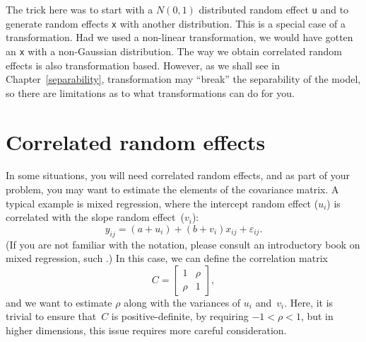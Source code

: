 \documentclass{admbmanual}
\newcommand{\citeasnoun}{\cite}
\begin{document}
The trick here was to start with a $N(0,1)$ distributed random effect \texttt{u}
and to generate random effects \texttt{x} with another distribution. This is a
special case of a transformation. Had we used a non-linear transformation, we
would have gotten an \texttt{x} with a non-Gaussian distribution. The way we
obtain correlated random effects is also transformation based. However, as we
shall see in Chapter~\ref{separability}, transformation may ``break'' the
separability of the model, so there are limitations as to what transformations
can do for you.

\section{Correlated random effects\label{sec:correlated}}

In some situations, you will need correlated random effects, and as part of your
problem, you may want to estimate the elements of the covariance matrix. A
typical example is mixed regression, where the intercept random effect ($u_{i}$)
is correlated with the slope random effect~($v_{i}$):
\[
  y_{ij}=(a+u_{i})+\left(b+v_{i}\right)x_{ij}+\varepsilon_{ij}.
\]
(If you are not familiar with the notation, please consult an introductory book
on mixed regression, such \citeasnoun{pinh:bate:2000}.) In this case, we can
define the correlation matrix
\[
 C=\left[\begin{array}{cc}
 1 & \rho\\
 \rho & 1\end{array}\right],
\]
and we want to estimate $\rho$ along with the variances of $u_{i}$ and~$v_{i}$.
Here, it is trivial to ensure that~$C$ is positive-definite, by requiring
$-1<\rho<1$, but in higher dimensions, this issue requires more careful
consideration.
\end{document}
